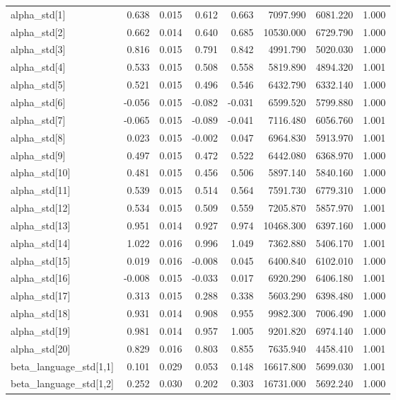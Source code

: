 \begin{tabular}{lrrrrrrr}
alpha\_std[1] & 0.638 & 0.015 & 0.612 & 0.663 & 7097.990 & 6081.220 & 1.000 \\
alpha\_std[2] & 0.662 & 0.014 & 0.640 & 0.685 & 10530.000 & 6729.790 & 1.000 \\
alpha\_std[3] & 0.816 & 0.015 & 0.791 & 0.842 & 4991.790 & 5020.030 & 1.000 \\
alpha\_std[4] & 0.533 & 0.015 & 0.508 & 0.558 & 5819.890 & 4894.320 & 1.001 \\
alpha\_std[5] & 0.521 & 0.015 & 0.496 & 0.546 & 6432.790 & 6332.140 & 1.000 \\
alpha\_std[6] & -0.056 & 0.015 & -0.082 & -0.031 & 6599.520 & 5799.880 & 1.000 \\
alpha\_std[7] & -0.065 & 0.015 & -0.089 & -0.041 & 7116.480 & 6056.760 & 1.001 \\
alpha\_std[8] & 0.023 & 0.015 & -0.002 & 0.047 & 6964.830 & 5913.970 & 1.001 \\
alpha\_std[9] & 0.497 & 0.015 & 0.472 & 0.522 & 6442.080 & 6368.970 & 1.000 \\
alpha\_std[10] & 0.481 & 0.015 & 0.456 & 0.506 & 5897.140 & 5840.160 & 1.000 \\
alpha\_std[11] & 0.539 & 0.015 & 0.514 & 0.564 & 7591.730 & 6779.310 & 1.000 \\
alpha\_std[12] & 0.534 & 0.015 & 0.509 & 0.559 & 7205.870 & 5857.970 & 1.001 \\
alpha\_std[13] & 0.951 & 0.014 & 0.927 & 0.974 & 10468.300 & 6397.160 & 1.000 \\
alpha\_std[14] & 1.022 & 0.016 & 0.996 & 1.049 & 7362.880 & 5406.170 & 1.001 \\
alpha\_std[15] & 0.019 & 0.016 & -0.008 & 0.045 & 6400.840 & 6102.010 & 1.000 \\
alpha\_std[16] & -0.008 & 0.015 & -0.033 & 0.017 & 6920.290 & 6406.180 & 1.001 \\
alpha\_std[17] & 0.313 & 0.015 & 0.288 & 0.338 & 5603.290 & 6398.480 & 1.000 \\
alpha\_std[18] & 0.931 & 0.014 & 0.908 & 0.955 & 9982.300 & 7006.490 & 1.000 \\
alpha\_std[19] & 0.981 & 0.014 & 0.957 & 1.005 & 9201.820 & 6974.140 & 1.000 \\
alpha\_std[20] & 0.829 & 0.016 & 0.803 & 0.855 & 7635.940 & 4458.410 & 1.001 \\
beta\_language\_std[1,1] & 0.101 & 0.029 & 0.053 & 0.148 & 16617.800 & 5699.030 & 1.001 \\
beta\_language\_std[1,2] & 0.252 & 0.030 & 0.202 & 0.303 & 16731.000 & 5692.240 & 1.000 \\

\end{tabular}
